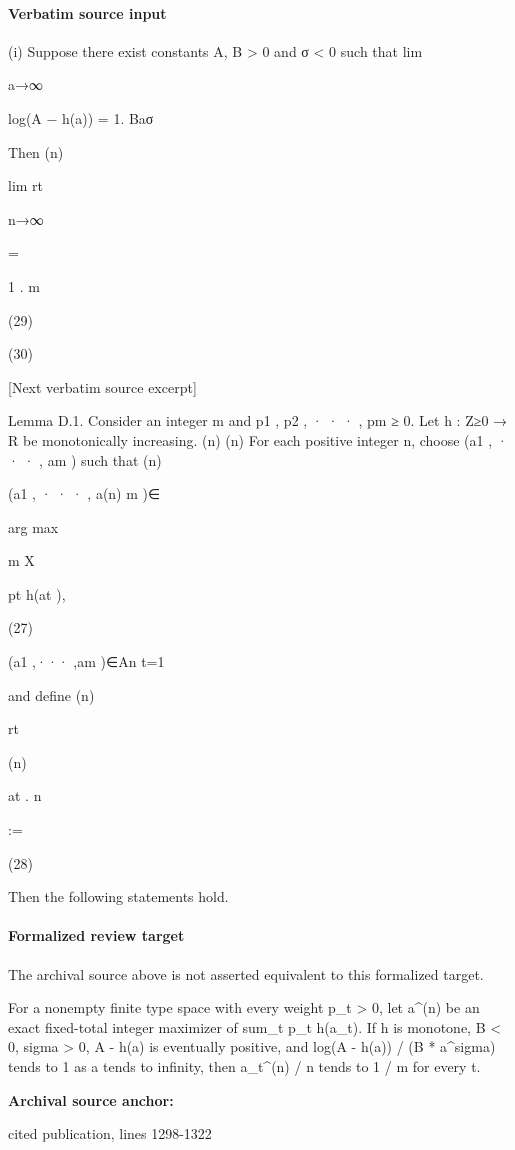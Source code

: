 \documentclass[10pt]{article}
\begin{document}
\paragraph{Verbatim source input}
\begin{ReviewVerbatim}
(i) Suppose there exist constants A, B > 0 and σ < 0 such that
lim

a→∞

log(A − h(a))
= 1.
Baσ

Then
(n)

lim rt

n→∞

=

1
.
m

(29)

(30)

[Next verbatim source excerpt]

Lemma D.1. Consider an integer m and p1 , p2 , · · · , pm ≥ 0. Let h : Z≥0 → R be monotonically increasing.
(n)
(n)
For each positive integer n, choose (a1 , · · · , am ) such that
(n)

(a1 , · · · , a(n)
m )∈

arg max

m
X

pt h(at ),

(27)

(a1 ,··· ,am )∈An t=1

and define
(n)

rt

(n)

at
.
n

:=

(28)

Then the following statements hold.
\end{ReviewVerbatim}


\paragraph{Formalized review target}
The archival source above is not asserted equivalent to this formalized target.
\begin{ReviewVerbatim}
For a nonempty finite type space with every weight p_t > 0, let a^(n) be an exact fixed-total integer maximizer of sum_t p_t h(a_t). If h is monotone, B < 0, sigma > 0, A - h(a) is eventually positive, and log(A - h(a)) / (B * a^sigma) tends to 1 as a tends to infinity, then a_t^(n) / n tends to 1 / m for every t.
\end{ReviewVerbatim}

\textbf{Archival source anchor:} {\footnotesize\raggedright cited publication, lines 1298-\allowbreak{}1322\par}
\end{document}

